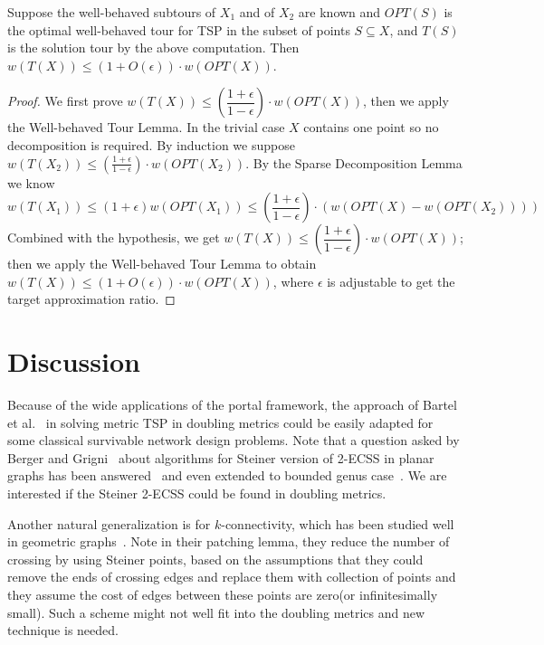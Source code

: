 \documentclass{llncs}
\begin{document}
\begin{lemma}
Suppose the well-behaved subtours of $X_1$ and of $X_2$ are known and $OPT(S)$ is the optimal well-behaved tour for TSP in the subset of points $S\subseteq X$, and $T(S)$ is the solution tour by the above computation.
Then $w(T(X))\leq (1+O(\epsilon))\cdot w(OPT(X))$.
\end{lemma}
\begin{proof}
We first prove $w(T(X))\leq(\dfrac{1+\epsilon}{1-\epsilon})\cdot w(OPT(X))$, then we apply the Well-behaved Tour Lemma.
In the trivial case $X$ contains one point so no decomposition is required.
By induction we suppose $w(T(X_2))\leq(\frac{1+\epsilon}{1-\epsilon})\cdot w(OPT(X_2))$.
By the Sparse Decomposition Lemma we know 
\begin{equation}
w(T(X_1))\leq (1+\epsilon)w(OPT(X_1))
\leq (\dfrac{1+\epsilon}{1-\epsilon})\cdot (w(OPT(X)-w(OPT(X_2))))
\end{equation}
Combined with the hypothesis, we get $w(T(X))\leq(\dfrac{1+\epsilon}{1-\epsilon})\cdot w(OPT(X))$; then we apply the Well-behaved Tour Lemma to obtain $w(T(X))\leq (1+O(\epsilon))\cdot w(OPT(X))$, where $\epsilon$ is adjustable to get the target approximation ratio.
\end{proof}




\section{Discussion}

Because of the wide applications of the portal framework, the approach of Bartel {et al.}~\cite{Bartal12} in solving metric TSP in doubling metrics could be easily adapted for some classical survivable network design problems.
Note that a question asked by Berger and Grigni~\cite{Grigni07} about algorithms for Steiner version of 2-ECSS in planar graphs has been answered~\cite{Borradaile08} and even extended to bounded genus case~\cite{Borradaile09}.
We are interested if the Steiner 2-ECSS could be found in doubling metrics.

Another natural generalization is for $k$-connectivity, which has been studied well in geometric graphs~\cite{Czumaj06}.
Note in their patching lemma, they reduce the number of crossing by using Steiner points, based on the assumptions that they could remove the ends of crossing edges and replace them with collection of points and they assume the cost of edges between these points are zero(or infinitesimally small).
Such a scheme might not well fit into the doubling metrics and new technique is needed.





























\end{document}
